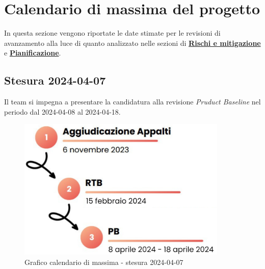 \documentclass[10pt, a4paper]{article}
\begin{document}
\newpage
\section{Calendario di massima del progetto}
In questa sezione vengono riportate le date stimate per le revisioni di avanzamento alla luce di quanto analizzato nelle sezioni di \hyperref[section:Rischi]{\textbf{Rischi e mitigazione}} e \hyperref[section:Pianificazione]{\textbf{Pianificazione}}.

\subsection{Stesura 2024-04-07}
Il team si impegna a presentare la candidatura alla revisione \textit{Pruduct Baseline\pg} nel periodo dal 2024-04-08 al 2024-04-18. \\
 \begin{figure}[H]
        \centering
        \includegraphics[width=10cm]{calendario di massima.png}
        \caption{Grafico calendario di massima - stesura 2024-04-07}
    \end{figure}

\newpage
\end{document}
